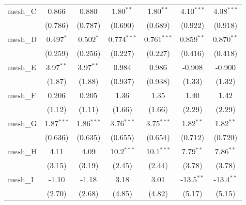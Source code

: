 \begin{tabular}{lcccccc}
   mesh\_C                                                     & 0.866         & 0.880         & 1.80$^{**}$   & 1.80$^{**}$   & 4.10$^{***}$  & 4.08$^{***}$\\   
                                                               & (0.786)       & (0.787)       & (0.690)       & (0.689)       & (0.922)       & (0.918)\\   
   mesh\_D                                                     & 0.497$^{*}$   & 0.502$^{*}$   & 0.774$^{***}$ & 0.761$^{***}$ & 0.859$^{**}$  & 0.870$^{**}$\\   
                                                               & (0.259)       & (0.256)       & (0.227)       & (0.227)       & (0.416)       & (0.418)\\   
   mesh\_E                                                     & 3.97$^{**}$   & 3.97$^{**}$   & 0.984         & 0.986         & -0.908        & -0.900\\   
                                                               & (1.87)        & (1.88)        & (0.937)       & (0.938)       & (1.33)        & (1.32)\\   
   mesh\_F                                                     & 0.206         & 0.205         & 1.36          & 1.35          & 1.40          & 1.42\\   
                                                               & (1.12)        & (1.11)        & (1.66)        & (1.66)        & (2.29)        & (2.29)\\   
   mesh\_G                                                     & 1.87$^{***}$  & 1.86$^{***}$  & 3.76$^{***}$  & 3.75$^{***}$  & 1.82$^{**}$   & 1.82$^{**}$\\   
                                                               & (0.636)       & (0.635)       & (0.655)       & (0.654)       & (0.712)       & (0.720)\\   
   mesh\_H                                                     & 4.11          & 4.09          & 10.2$^{***}$  & 10.1$^{***}$  & 7.79$^{**}$   & 7.86$^{**}$\\   
                                                               & (3.15)        & (3.19)        & (2.45)        & (2.44)        & (3.78)        & (3.78)\\   
   mesh\_I                                                     & -1.10         & -1.18         & 3.18          & 3.01          & -13.5$^{**}$  & -13.4$^{**}$\\   
                                                               & (2.70)        & (2.68)        & (4.85)        & (4.82)        & (5.17)        & (5.15)\\   

\end{tabular}
